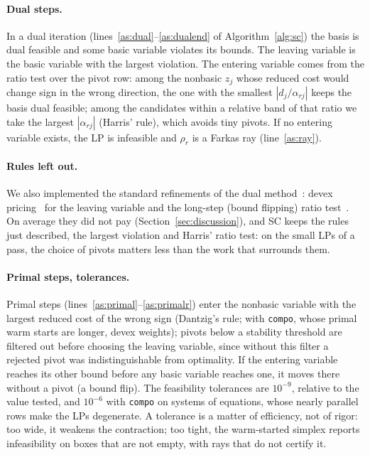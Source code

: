 \documentclass[11pt]{article}
\theoremstyle{definition}
\theoremstyle{remark}
\begin{document}
\paragraph{Dual steps.} In a dual iteration
(lines~\ref{as:dual}--\ref{as:dualend} of Algorithm~\ref{alg:sc}) the basis is
dual feasible and some basic variable violates its bounds. The leaving variable is the basic
variable with the largest violation. The entering variable comes from the
ratio test over the pivot row: among the nonbasic $z_j$ whose reduced cost
would change sign in the wrong direction, the one with the smallest
$|d_j/\alpha_{rj}|$ keeps the basis dual feasible; among the candidates within
a relative band of that ratio we take the largest $|\alpha_{rj}|$ (Harris'
rule), which avoids tiny pivots. If no entering variable exists, the LP is
infeasible and $\rho_r$ is a Farkas ray (line~\ref{as:ray}).

\paragraph{Rules left out.} We also implemented the standard refinements of
the dual method~\cite{koberstein2005dual}: devex
pricing~\cite{harris1973devex} for the leaving variable and the long-step (bound
flipping) ratio test~\cite{maros2003generalized}. On average
they did not pay (Section~\ref{sec:discussion}), and SC keeps the rules just
described, the largest violation and Harris' ratio test: on the small LPs of a pass, the choice of pivots matters less
than the work that surrounds them.

\paragraph{Primal steps, tolerances.} Primal steps
(lines~\ref{as:primal}--\ref{as:primalr}) enter the nonbasic
variable with the largest reduced cost of the wrong sign (Dantzig's rule;
with \texttt{compo}, whose primal warm starts are longer, devex weights);
pivots below a stability threshold are filtered out before choosing the
leaving variable, since without this filter a rejected pivot was
indistinguishable from optimality. If the entering variable reaches its other
bound before any basic variable reaches one, it moves there without a pivot (a
bound flip). The feasibility tolerances are $10^{-9}$,
relative to the value tested, and $10^{-6}$ with \texttt{compo} on systems of
equations, whose nearly parallel rows make the LPs degenerate. A tolerance is a
matter of efficiency, not of rigor: too wide, it weakens the contraction; too
tight, the warm-started simplex reports infeasibility on boxes that are not
empty, with rays that do not certify it.
\end{document}
